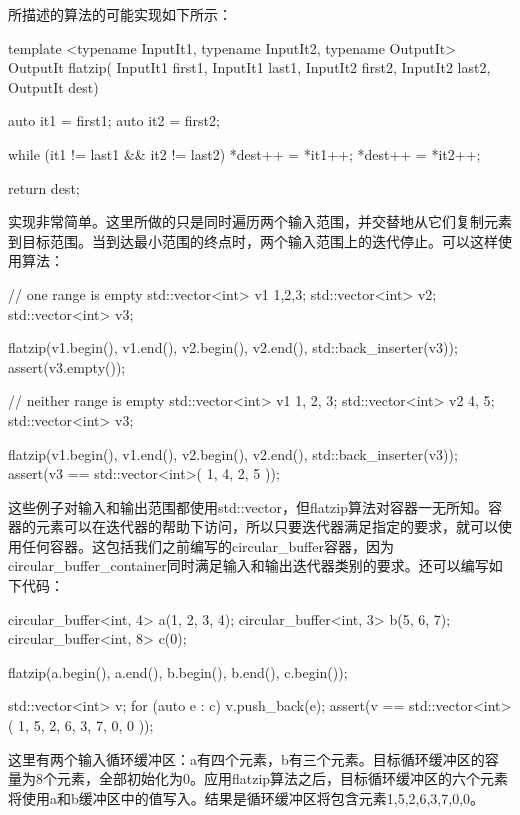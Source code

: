 所描述的算法的可能实现如下所示：

\begin{cpp}
template <typename InputIt1, typename InputIt2,
		  typename OutputIt>
OutputIt flatzip(
	InputIt1 first1, InputIt1 last1,
	InputIt2 first2, InputIt2 last2,
	OutputIt dest)
{
	auto it1 = first1;
	auto it2 = first2;
	
	while (it1 != last1 && it2 != last2)
	{
		*dest++ = *it1++;
		*dest++ = *it2++;
	}

	return dest;
}
\end{cpp}

实现非常简单。这里所做的只是同时遍历两个输入范围，并交替地从它们复制元素到目标范围。当到达最小范围的终点时，两个输入范围上的迭代停止。可以这样使用算法：

\begin{cpp}
// one range is empty
std::vector<int> v1 {1,2,3};
std::vector<int> v2;
std::vector<int> v3;

flatzip(v1.begin(), v1.end(), v2.begin(), v2.end(),
		std::back_inserter(v3));
assert(v3.empty());

// neither range is empty
std::vector<int> v1 {1, 2, 3};
std::vector<int> v2 {4, 5};
std::vector<int> v3;

flatzip(v1.begin(), v1.end(), v2.begin(), v2.end(),
		std::back_inserter(v3));
assert(v3 == std::vector<int>({ 1, 4, 2, 5 }));
\end{cpp}

这些例子对输入和输出范围都使用std::vector，但flatzip算法对容器一无所知。容器的元素可以在迭代器的帮助下访问，所以只要迭代器满足指定的要求，就可以使用任何容器。这包括我们之前编写的circular\_buffer容器，因为circular\_buffer\_container同时满足输入和输出迭代器类别的要求。还可以编写如下代码：

\begin{cpp}
circular_buffer<int, 4> a({1, 2, 3, 4});
circular_buffer<int, 3> b({5, 6, 7});
circular_buffer<int, 8> c(0);

flatzip(a.begin(), a.end(), b.begin(), b.end(), c.begin());

std::vector<int> v;
for (auto e : c)
	v.push_back(e);
assert(v == std::vector<int>({ 1, 5, 2, 6, 3, 7, 0, 0 }));
\end{cpp}

这里有两个输入循环缓冲区：a有四个元素，b有三个元素。目标循环缓冲区的容量为8个元素，全部初始化为0。应用flatzip算法之后，目标循环缓冲区的六个元素将使用a和b缓冲区中的值写入。结果是循环缓冲区将包含元素1,5,2,6,3,7,0,0。













